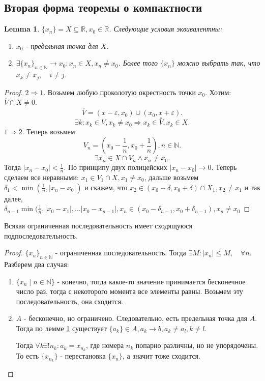 \documentclass[11pt]{book}
\newcommand{\N}{\mathbb{N}}
\newcommand{\R}{\mathbb{R}}
\newcommand{\pivi}{\stackrel \circ }
\renewcommand{\le}{\leqslant}
\theoremstyle{definition}
\theoremstyle{plain}
\theoremstyle{plain}
\newtheorem*{lm}{Lemma}
\theoremstyle{definition}
\theoremstyle{remark}
\begin{document}
\subsection{Вторая форма теоремы о компактности}\label{ques_35}
\begin{lm}\label{lm_for_the_second_form_of_the_theorm_of_compact}
    $\{x_{n}\} = X \subseteq \R, x_0 \in  \R$. Следующие условия эквивалентны: $ $
    \begin{enumerate}
        \item $x_0$ - предельная точка для $X$.
	\item $\exists \{x_n\}_{n \in \N} \to x_0 : x_n \in  X, x_n \ne x_0$. Более того $\{x_n\}$ можно выбрать так, что $x_k \ne x_j, \quad i\ne j$.
    \end{enumerate}
\end{lm}
\begin{proof}
    $2 \Rightarrow  1$.
    Возьмем любую проколотую окрестность точки $x_0$. Хотим:  $\pivi V \cap X \ne 0$.\[
	\pivi V = (x -\varepsilon , x_0) \cup (x_0, x+ \varepsilon )
    .\] 
     \[
    \exists k : x_k \in  V, x_k \ne x_0 \Rightarrow x_k \in  \pivi V, x_k \in  X
    .\] 
    $1 \Rightarrow 2$.
    Теперь возьмем 
     \[
	 V_n = (x_0 -\frac{1}{n}, x_0 + \frac{1}{n}), n \in  \N
    .\] 
    \[
	\exists x_n \in  X \cap V_n \wedge x_n \ne x_0
    .\] 
    Тогда $|x_n - x_0| < \frac{1}{n}$. По принципу двух полицейских $|x_n - x_0| \to  0$.
    Теперь сделаем все неравными:
    $x_1 \in  V_1 \cap X, x_1 \ne x_0$, дальше возьмем $\delta_1  < \min (\frac{1}{n} , |x_n - x_0|)$ и скажем, что $x_2 \in  (x_0 - \delta , x_0 + \delta ) \cap X_1, x_2 \ne x_1$ и так далее, $\delta_{n-1} \min (\frac{1}{n}, |x_0 -x_1|, \ldots |x_0 - x_{n-1}|, x_n \in  (x_0 - \delta _{n-1}, x_0 + \delta_{n-1}), x_n \ne x_0 $
\end{proof}
\begin{thm}
    Всякая ограниченная последовательность имеет сходящуюся подпоследовательность.
\end{thm}
\begin{proof}
    $\{x_n\}_{n \in \N}$ - ограниченная последовательность. Тогда $\exists M: |x_n| \le M, \quad \forall n$. Разберем два случая:
    $ $
    \begin{enumerate}
        \item $\{x_n \mid n \in  \N\}$ - конечно, тогда какое-то значение принимается бесконечное число раз, тогда с некоторого момента все элементы равны. Возьмем эту последовательность, она сходится.
	\item $A$ - бесконечно, но ограничено. Следовательно, есть предельная точка для $A$.
	    Тогда по лемме \ref{lm_for_the_second_form_of_the_theorm_of_compact} существует $\{a_k\} \in  A, a_k \to  b,  a_k \ne a_l , k \ne l$.

	    Тогда $\forall k \exists ! n_k: a_k=x_{n_k}$, где номера $n_k$ попарно различны, но не упорядочены. То есть $\{x_{n_k}\}$ - перестановка $\{x_n\}$, а значит тоже сходится.
    \end{enumerate}
\end{proof}
\end{document}
